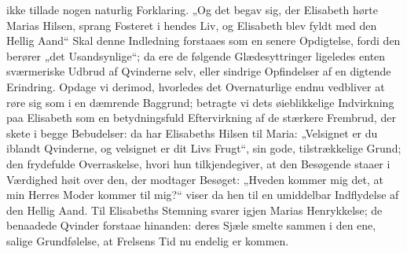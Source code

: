 \documentclass[12pt,a4paper]{book}
\begin{document}
ikke tillade nogen naturlig Forklaring.
„Og det begav sig, der Elisabeth hørte Marias Hilsen, sprang Fosteret i hendes
Liv, og Elisabeth blev fyldt med den Hellig Aand“ Skal denne Indledning
forstaaes som en senere Opdigtelse, fordi den berører „det Usandsynlige“; da ere
de følgende Glædesyttringer ligeledes enten sværmeriske Udbrud af Qvinderne
selv, eller sindrige Opfindelser af en digtende Erindring. Opdage vi derimod,
hvorledes det Overnaturlige endnu vedbliver at røre sig som i en dæmrende
Baggrund; betragte vi dets øieblikkelige Indvirkning paa Elisabeth som en
betydningsfuld Eftervirkning af de stærkere Frembrud, der skete i begge
Bebudelser: da har Elisabeths Hilsen til Maria: „Velsignet er du iblandt
Qvinderne, og velsignet er dit Livs Frugt“, sin gode, tilstrækkelige Grund; den
frydefulde Overraskelse, hvori hun tilkjendegiver, at den Besøgende staaer i
Værdighed høit over den, der
modtager Besøget: „Hveden kommer mig det, at min Herres Moder kommer til mig?“
viser da hen til en umiddelbar Indflydelse af den Hellig Aand. Til Elisabeths
Stemning svarer igjen Marias Henrykkelse; de benaadede Qvinder forstaae
hinanden: deres Sjæle smelte sammen i den ene, salige Grundfølelse, at Frelsens
Tid nu endelig er kommen.
\end{document}
